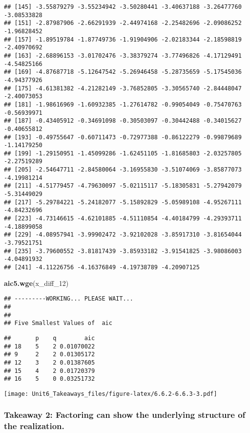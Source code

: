\documentclass[
]{article}
\newenvironment{Shaded}{\begin{snugshade}}{\end{snugshade}}
\newcommand{\DecValTok}[1]{\textcolor[rgb]{0.00,0.00,0.81}{#1}}
\newcommand{\KeywordTok}[1]{\textcolor[rgb]{0.13,0.29,0.53}{\textbf{#1}}}
\newcommand{\NormalTok}[1]{#1}
\begin{document}
\begin{verbatim}
## [145] -3.55879279 -3.55234942 -3.50280441 -3.40637188 -3.26477760 -3.08533828
## [151] -2.87987906 -2.66291939 -2.44974168 -2.25482696 -2.09086252 -1.96828452
## [157] -1.89519784 -1.87749736 -1.91904906 -2.02183344 -2.18598819 -2.40970692
## [163] -2.68896153 -3.01702476 -3.38379274 -3.77496826 -4.17129491 -4.54825166
## [169] -4.87687718 -5.12647542 -5.26946458 -5.28735659 -5.17545036 -4.94377926
## [175] -4.61381382 -4.21282149 -3.76852805 -3.30565740 -2.84448047 -2.40073053
## [181] -1.98616969 -1.60932385 -1.27614782 -0.99054049 -0.75470763 -0.56939971
## [187] -0.43405912 -0.34691098 -0.30503097 -0.30442488 -0.34015627 -0.40655812
## [193] -0.49755647 -0.60711473 -0.72977388 -0.86122279 -0.99879689 -1.14179250
## [199] -1.29150951 -1.45099286 -1.62451105 -1.81685803 -2.03257805 -2.27519289
## [205] -2.54647711 -2.84580064 -3.16955830 -3.51074069 -3.85877073 -4.19981214
## [211] -4.51779457 -4.79630097 -5.02115117 -5.18305831 -5.27942079 -5.31449029
## [217] -5.29784221 -5.24182077 -5.15892829 -5.05989108 -4.95267111 -4.84232696
## [223] -4.73146615 -4.62101885 -4.51110854 -4.40184799 -4.29393711 -4.18899058
## [229] -4.08957941 -3.99902472 -3.92102028 -3.85917310 -3.81654044 -3.79521751
## [235] -3.79600552 -3.81817439 -3.85933182 -3.91541825 -3.98086003 -4.04891932
## [241] -4.11226756 -4.16376849 -4.19738789 -4.20907125
\end{verbatim}

\begin{Shaded}
\begin{Highlighting}[]
\KeywordTok{aic5.wge}\NormalTok{(x_diff_}\DecValTok{12}\NormalTok{)}
\end{Highlighting}
\end{Shaded}

\begin{verbatim}
## ---------WORKING... PLEASE WAIT... 
## 
## 
## Five Smallest Values of  aic
\end{verbatim}

\begin{verbatim}
##       p    q        aic
## 18    5    2 0.01070022
## 9     2    2 0.01305172
## 12    3    2 0.01387605
## 15    4    2 0.01720379
## 16    5    0 0.03251732
\end{verbatim}

\texttt{[image: Unit6\_Takeaways\_files/figure-latex/6.6.2-6.6.3-3.pdf]}

\hypertarget{takeaway-2-factoring-can-show-the-underlying-structure-of-the-realization.}{%
\subsubsection{Takeaway 2: Factoring can show the underlying structure
of the
realization.}\label{takeaway-2-factoring-can-show-the-underlying-structure-of-the-realization.}}
\end{document}
